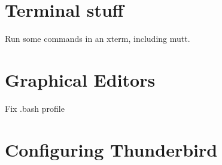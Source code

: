
\section{Terminal stuff}

Run some commands in an xterm, including mutt.

\section{Graphical Editors}

\begin{note}
 Fix .bash profile
\end{note}


\section{Configuring Thunderbird}

